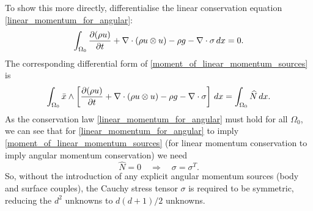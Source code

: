 To show this more directly, differentialise the linear conservation equation \eqref{linear_momentum_for_angular}:
\begin{equation}
    \int_{{\Omega_0}} \frac{\partial (\rho u)}{\partial t} + \nabla\cdot\left(\rho u\otimes u\right) - \rho g - \nabla\cdot\sigma\,dx = 0.
\end{equation}
The corresponding differential form of \eqref{moment_of_linear_momentum_sources} is
\begin{equation}
    \int_{{\Omega_0}} \bar{x} \wedge \left[\frac{\partial (\rho u)}{\partial t} + \nabla\cdot\left(\rho u\otimes u\right) - \rho g - \nabla\cdot\sigma\right]\,dx
    = \int_{\Omega_0} \widehat{N}\,dx.
\end{equation}
As the conservation law \eqref{linear_momentum_for_angular} must hold for all $\Omega_0$, we can see that for \eqref{linear_momentum_for_angular}
to imply \eqref{moment_of_linear_momentum_sources} (for linear momentum conservation to imply angular momentum conservation) we need
\begin{equation}
    \widehat{N} = 0 \quad\Rightarrow\quad \sigma = \sigma^T.
\end{equation}
So, without the introduction of any explicit angular momentum sources (body and surface couples), the Cauchy stress tensor $\sigma$ is required to be symmetric,
reducing the $d^2$ unknowns to $d(d+1)/2$ unknowns.



